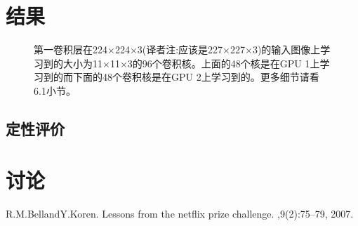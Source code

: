 \documentclass[12pt]{article}
\begin{document}
\begin{CJK*}{UTF8}{gkai}
\section{结果}


\begin{figure}[h]
  \centering
  \caption{第一卷积层在224×224×3(译者注:应该是227×227×3)的输入图像上学习到的大小为11×11×3的96个卷积核。上面的48个核是在GPU 1上学习到的而下面的48个卷积核是在GPU 2上学习到的。更多细节请看6.1小节。}
  \label{fig:fig3}
\end{figure}

\subsection{定性评价}



\section{讨论}




  
% 

\begin{thebibliography}{1}

R.M.BellandY.Koren.
\newblock Lessons from the netflix prize challenge.
,9(2):75–79, 2007. 


\end{thebibliography}
\end{CJK*}
\end{document}
